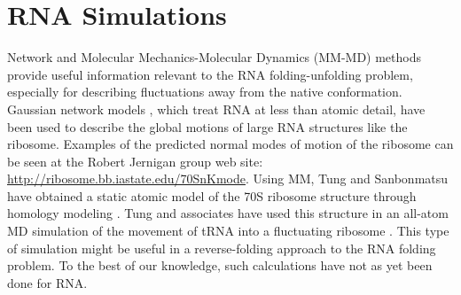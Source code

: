 \section{RNA Simulations}
Network  and Molecular  Mechanics-Molecular  Dynamics (MM-MD)  methods
provide  useful  information  relevant  to the  RNA  folding-unfolding
problem, especially  for describing fluctuations away  from the native
conformation.   Gaussian network  models  \cite{y_wang2004, bahar1998,
  wang2005}, which  treat RNA  at less than  atomic detail,  have been
used to describe  the global motions of large  RNA structures like the
ribosome.  Examples  of the  predicted normal modes  of motion  of the
ribosome  can  be  seen  at   the  Robert  Jernigan  group  web  site:
\url{http://ribosome.bb.iastate.edu/70SnKmode}.   Using  MM, Tung  and
Sanbonmatsu have  obtained a static  atomic model of the  70S ribosome
structure  through   homology  modeling  \cite{tung2004}.    Tung  and
associates have  used this structure  in an all-atom MD  simulation of
the    movement    of     tRNA    into    a    fluctuating    ribosome
\cite{sanbonmatsu2005}.  This type of  simulation might be useful in a
reverse-folding approach to  the RNA folding problem.  To  the best of
our knowledge, such calculations have not as yet been done for RNA.

